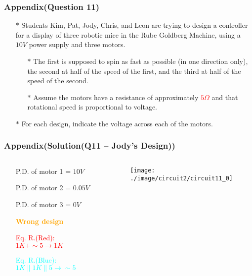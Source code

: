 \documentclass{beamer}
\newcommand{\red}[1]{\textcolor{red}{#1}}
\newcommand{\orange}[1]{\textcolor{orange}{#1}}
\newcommand{\cyan}[1]{\textcolor{cyan}{#1}}
\begin{document}

\begin{frame}
\frametitle{Appendix(Question 11)}
\begin{itemize} \itemsep1pt \parskip0pt 
  \item[$\ast$] Students Kim, Pat, Jody, Chris, and Leon are trying to design a controller for a display of three robotic mice in the Rube Goldberg Machine, using a $10V$ power supply and three motors.
  \begin{itemize} \itemsep1pt \parskip0pt 
    \item[$\ast$] The first is supposed to spin as fast as possible (in one direction only), the second at half of the speed of the first, and the third at half of the speed of the second.
    \item[$\ast$] Assume the motors have a resistance of approximately \red{$5\Omega$} and that rotational speed is proportional to voltage.
  \end{itemize}
  \item[$\ast$] For each design, indicate the voltage across each of the motors.
\end{itemize}


\end{frame}


\begin{frame}
\frametitle{Appendix(Solution(Q11 -- Jody's Design))}
\begin{columns}
\begin{column}{6.5cm}
\begin{itemize} \itemsep1pt \parskip0pt 
  \item[] P.D. of motor 1 = $10V$
  \item[] P.D. of motor 2 = $0.05V$
  \item[] P.D. of motor 3 = $0V$
  \item[] \orange{\bf Wrong design}
\end{itemize}

\begin{itemize} \itemsep1pt \parskip0pt 
  \item[] \red{Eq. R.(Red): $1K + \sim 5 \rightarrow 1K$}
  \item[] \cyan{Eq. R.(Blue): $1K \parallel 1K \parallel 5 \rightarrow \sim 5$}
\end{itemize}
\end{column}


\begin{column}{5.5cm}
\begin{figure}[H]
  \centering
  \texttt{[image: ./image/circuit2/circuit11\_0]}
\end{figure}
\end{column}
\end{columns}

\end{frame}
\end{document}
